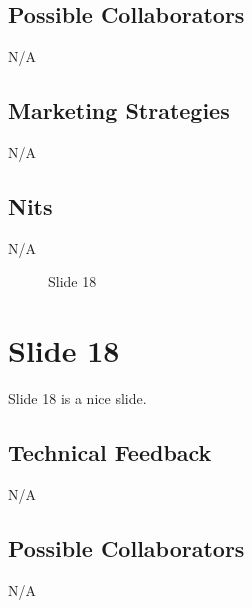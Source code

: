 \documentclass[11pt, oneside]{article}   	%
\begin{document}
\subsection{Possible Collaborators}
\label{slide17:possible_collaborators}
N/A

\subsection{Marketing Strategies}
\label{slide17:marketing_strategies}
N/A

\subsection{Nits}
\label{slide17:nits}
N/A

\begin{figure}
\caption{Slide 18}
\label{fig:slide18}
\end{figure}


\section{Slide 18}
\label{sec:slide18}

Slide 18 is a nice slide. 

\subsection{Technical Feedback}
\label{slide18:technical_feedback}
N/A

\subsection{Possible Collaborators}
\label{slide18:possible_collaborators}
N/A
\end{document}
